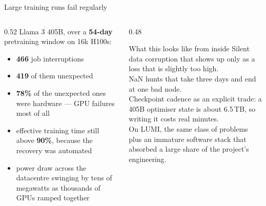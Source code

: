 \documentclass[aspectratio=169,10pt]{beamer}
\begin{document}
\begin{frame}{Large training runs fail regularly}
  \begin{columns}[T]
    \begin{column}{0.52\textwidth}
      Llama 3 405B, over a \textbf{54-day} pretraining window on 16k H100s:
      \begin{itemize}\small
        \item \textbf{466} job interruptions
        \item \textbf{419} of them unexpected
        \item \textbf{78\%} of the unexpected ones were hardware --- GPU
          failures most of all
        \item effective training time still above \textbf{90\%}, because the
          recovery was automated
        \item power draw across the datacentre swinging by tens of megawatts as
          thousands of GPUs ramped together
      \end{itemize}
    \end{column}
    \begin{column}{0.48\textwidth}
      \begin{block}{What this looks like from inside}
        \small
        Silent data corruption that shows up only as a loss that is slightly
        too high.\\[0.3em]
        NaN hunts that take three days and end at one bad node.\\[0.3em]
        Checkpoint cadence as an explicit trade: a 405B optimiser state is
        about 6.5\,TB, so writing it costs real minutes.\\[0.3em]
        On LUMI, the same class of problems plus an immature software stack
        that absorbed a large share of the project's engineering.
      \end{block}
    \end{column}
  \end{columns}
\end{frame}
\end{document}

